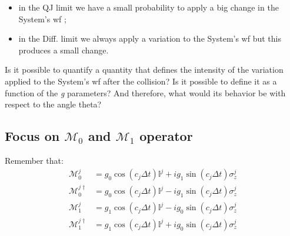 \documentclass[a4paper,12pt]{article}
\begin{document}
\begin{itemize}
	\item in the QJ limit we have a small probability to apply a big change in the System's wf ;
	\item in the Diff. limit we always apply a variation to the System's wf but this produces a small change.
\end{itemize}

Is it possible to quantify a quantity that defines the intensity of the variation applied to the System's wf after the collision? Is it possible to define it as a function of the \textit{g} parameters? And therefore, what would its behavior be with respect to the angle theta?

\subsection{Focus on $\mathcal{M}_0$ and $\mathcal{M}_1$ operator}
\label{sub:focus_on_M0_M1}
Remember that:
\begin{align*}
	\mathcal{M}_{0}^{j} &= g_0 \cos(c_j \Delta t) \mathbb{I}^{j} + i g_1 \sin(c_j \Delta t) \sigma_{z}^{j} \\
	\mathcal{M}_0^{j \dagger} &= g_0 \cos(c_j \Delta t) \mathbb{I}^{j} - i g_1 \sin(c_j \Delta t) \sigma_{z}^{j} \\
	\mathcal{M}_{1}^{j} &= g_1 \cos(c_j \Delta t) \mathbb{I}^{j} - i g_0 \sin(c_j \Delta t) \sigma_{z}^{j} \\
	\mathcal{M}_1^{j \dagger} &= g_1 \cos(c_j \Delta t) \mathbb{I}^{j} + i g_0 \sin(c_j \Delta t) \sigma_{z}^{j}
\end{align*}
\end{document}

